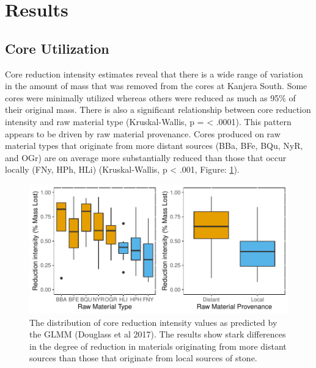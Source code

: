 \documentclass[]{elsarticle} %
\makeatletter
\def\maxwidth{\ifdim\Gin@nat@width>\linewidth\linewidth
\else\Gin@nat@width\fi}
\let\Oldincludegraphics\includegraphics
\renewcommand{\includegraphics}[1]{\Oldincludegraphics[width=\maxwidth]{#1}}
\makeatother
\begin{document}
\hypertarget{results}{%
\section{Results}\label{results}}

\hypertarget{core-utilization}{%
\subsection{Core Utilization}\label{core-utilization}}

Core reduction intensity estimates reveal that there is a wide range of
variation in the amount of mass that was removed from the cores at
Kanjera South. Some cores were minimally utilized whereas others were
reduced as much as 95\% of their original mass. There is also a
significant relationship between core reduction intensity and raw
material type (Kruskal-Wallis, p = \textless{} .0001). This pattern
appears to be driven by raw material provenance. Cores produced on raw
material types that originate from more distant sources (BBa, BFe, BQu,
NyR, and OGr) are on average more substantially reduced than those that
occur locally (FNy, HPh, HLi) (Kruskal-Wallis, p \textless{} .001,
Figure: \ref{core_redux_rm}).

\begin{figure}
\centering
\includegraphics{Reeves_Braun_et_al_2020_Kanjera_South_JHE_files/figure-latex/Figure:core reduction intentisity-1.pdf}
\caption{The distribution of core reduction intensity values as
predicted by the GLMM (Douglass et al 2017). The results show stark
differences in the degree of reduction in materials originating from
more distant sources than those that originate from local sources of
stone. \label{core_redux_rm}}
\end{figure}
\end{document}
